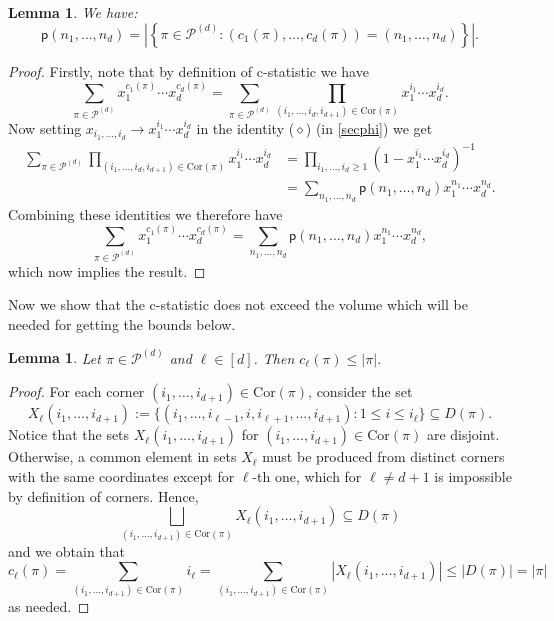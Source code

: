 \documentclass[12pt]{amsart}
\newtheorem{lemma}[theorem]{Lemma}
\theoremstyle{definition}
\theoremstyle{remark}
\begin{document}
\begin{lemma}\label{wp}
We have: %
$$
\mathsf{p}(n_1,\ldots, n_d) = \left| \left\{\pi \in \mathcal{P}^{(d)} : (c_1(\pi), \ldots, c_d(\pi)) = (n_1,\ldots, n_d) \right\} \right|.
$$
\end{lemma}
\begin{proof}
Firstly, note that by definition of c-statistic we have
$$
\sum_{\pi \in \mathcal{P}^{(d)}} x_1^{c_1(\pi)} \cdots x_d^{c_d(\pi)} = \sum_{\pi \in \mathcal{P}^{(d)}} \prod_{(i_1,\ldots, i_d, i_{d+1}) \in \mathrm{Cor}(\pi)} x_1^{i_1} \cdots x_d^{i_d}.
$$
Now setting $x_{i_1,\ldots, i_d} \to x_1^{i_1} \cdots x_d^{i_d}$ in the identity ($\diamond$) (in \textsection\ref{secphi}) %
we get
\begin{align*}%
\sum_{\pi \in \mathcal{P}^{(d)}} \prod_{(i_1,\ldots, i_d, i_{d+1}) \in \mathrm{Cor}(\pi)} x_1^{i_1} \cdots x_d^{i_d} %
&=\prod_{i_1,\ldots, i_d \ge 1} \left(1 - x_1^{i_1} \cdots x_d^{i_d} \right)^{-1} \\
&= \sum_{n_1,\ldots, n_d} \mathsf{p}(n_1,\ldots, n_d) x_1^{n_1} \cdots x_{d}^{n_d}.
\end{align*}
Combining these identities we therefore have %
$$
\sum_{\pi \in \mathcal{P}^{(d)}} x_1^{c_1(\pi)} \cdots x_d^{c_d(\pi)} = \sum_{n_1,\ldots, n_d} \mathsf{p}(n_1,\ldots, n_d) x_1^{n_1} \cdots x_{d}^{n_d}, 
$$ 
which now implies the result.
\end{proof}

Now we show that the c-statistic does not exceed the volume which will be needed for getting the bounds below.

\begin{lemma}
Let $\pi \in \mathcal{P}^{(d)}$ and $\ell \in [d]$. Then $c_{\ell}(\pi) \le |\pi|$. 
\end{lemma}
\begin{proof}
For each corner $(i_1,\ldots, i_{d+1}) \in \mathrm{Cor}(\pi)$,  consider the set 
$$X_{\ell}(i_1,\ldots, i_{d+1}) :=  \{(i_1, \ldots, i_{\ell - 1}, i, i_{\ell + 1}, \ldots, i_{d+1}) : 1 \le i  \le i_{\ell} \} \subseteq D(\pi).$$ 
Notice that the sets $X_{\ell}(i_1,\ldots, i_{d+1})$ for $(i_1,\ldots, i_{d+1}) \in \mathrm{Cor}(\pi)$ are disjoint. Otherwise, a common element in sets $X_{\ell}$ must be produced from distinct corners with the same coordinates except for $\ell$-th one, which for $\ell \ne d+1$ is impossible by definition of corners. %
Hence, 
$$\bigsqcup_{(i_1,\ldots, i_{d+1}) \in \mathrm{Cor}(\pi)} X_{\ell}(i_1,\ldots, i_{d+1}) \subseteq D(\pi)$$
and we obtain that  
$$
c_{\ell}(\pi) = \sum_{(i_1,\ldots, i_{d+1}) \in \mathrm{Cor}(\pi)} i_{\ell} = \sum_{(i_1,\ldots, i_{d+1}) \in \mathrm{Cor}(\pi)} |X_{\ell}(i_1,\ldots, i_{d+1})| \le |D(\pi)| = |\pi|
$$
as needed. 
\end{proof}
\end{document}
